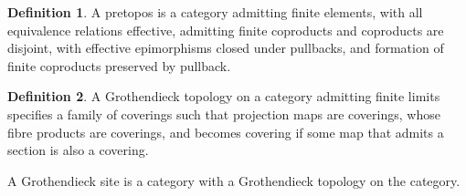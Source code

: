 \documentclass[10pt]{article}
\theoremstyle{plain}%
\theoremstyle{definition}
\newtheorem{definition}{Definition}[section]
\theoremstyle{remark}
\begin{document}
\begin{definition}
	A pretopos is a category admitting finite elements, with all equivalence relations effective, admitting finite coproducts and coproducts are disjoint, with effective epimorphisms closed under pullbacks, and formation of finite coproducts preserved by pullback.
\end{definition}

\begin{definition}
	A Grothendieck topology on a category admitting finite limits specifies a family of coverings such that projection maps are coverings, whose fibre products are coverings, and becomes covering if some map that admits a section is also a covering.

	A Grothendieck site is a category with a Grothendieck topology on the category.
\end{definition}
\end{document}
